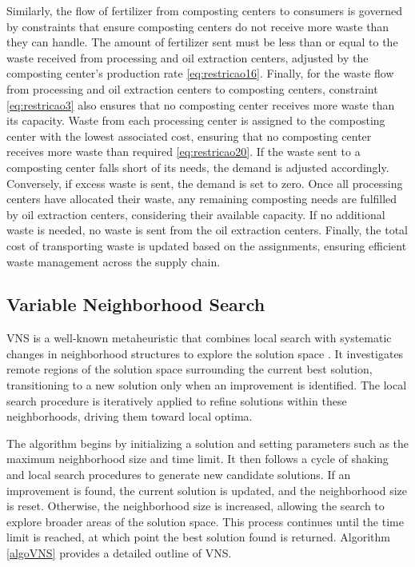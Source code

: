 \documentclass[sn-nature]{sn-jnl}%
\theoremstyle{thmstyleone}%
\theoremstyle{thmstyletwo}%
\theoremstyle{thmstylethree}%
\begin{document}
Similarly, the flow of fertilizer from composting centers to consumers is governed by constraints that ensure composting centers do not receive more waste than 
they can handle. The amount of fertilizer sent must be less than or equal to the waste received from processing and oil extraction centers, adjusted by the 
composting center's production rate \eqref{eq:restricao16}. Finally, for the waste flow from processing and oil extraction centers to composting centers, constraint \eqref{eq:restricao3} also ensures that no 
composting center receives more waste than its capacity. Waste from each processing center is assigned to the composting center with the lowest associated cost, 
ensuring that no composting center receives more waste than required \eqref{eq:restricao20}. If the waste sent to a composting center falls short of its needs, the demand is adjusted 
accordingly. Conversely, if excess waste is sent, the demand is set to zero. Once all processing centers have allocated their waste, any remaining composting 
needs are fulfilled by oil extraction centers, considering their available capacity. If no additional waste is needed, no waste is sent from the oil extraction 
centers. Finally, the total cost of transporting waste is updated based on the assignments, ensuring efficient waste management across the supply chain.

\subsection{Variable Neighborhood Search}
VNS is a well-known metaheuristic that combines local search with
systematic changes in neighborhood structures to explore the solution space \cite{gendreau2010handbook}. It investigates remote regions of the solution space surrounding the current best solution, transitioning to a new solution only when an improvement is identified. The local search procedure is iteratively applied to refine solutions within these neighborhoods, driving them toward local optima.

The algorithm begins by initializing a solution and setting parameters such as the maximum neighborhood size and time limit. 
It then follows a cycle of shaking and local search procedures to generate new candidate solutions. If an improvement is found, the current solution is 
updated, and the neighborhood size is reset. Otherwise, the neighborhood size is increased, allowing the search to explore broader areas of the solution 
space. This process continues until the time limit is reached, at which point the best solution found is returned. Algorithm \ref{algoVNS} provides a detailed 
outline of VNS.
\end{document}
